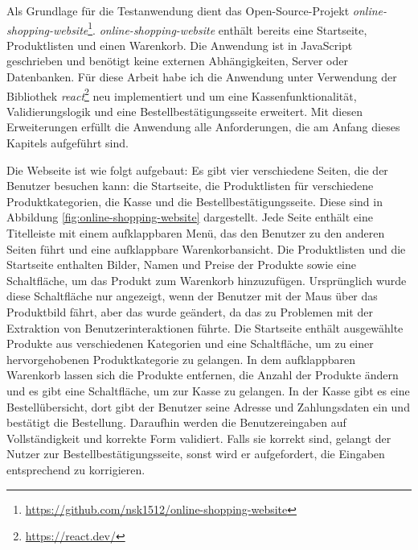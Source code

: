 Als Grundlage für die Testanwendung dient das Open-Source-Projekt \textit{online-shopping-website}\footnote{\url{https://github.com/nsk1512/online-shopping-website}}.
\textit{online-shopping-website} enthält bereits eine Startseite, Produktlisten und einen Warenkorb.
Die Anwendung ist in JavaScript geschrieben und benötigt keine externen Abhängigkeiten, Server oder Datenbanken.
Für diese Arbeit habe ich die Anwendung unter Verwendung der Bibliothek \textit{react}\footnote{\url{https://react.dev/}} neu implementiert und um eine Kassenfunktionalität, Validierungslogik und eine Bestellbestätigungsseite erweitert.
Mit diesen Erweiterungen erfüllt die Anwendung alle Anforderungen, die am Anfang dieses Kapitels aufgeführt sind.


Die Webseite ist wie folgt aufgebaut:
Es gibt vier verschiedene Seiten, die der Benutzer besuchen kann: die Startseite, die Produktlisten für verschiedene Produktkategorien, die Kasse und die Bestellbestätigungsseite.
Diese sind in Abbildung \ref{fig:online-shopping-website} dargestellt.
Jede Seite enthält eine Titelleiste mit einem aufklappbaren Menü, das den Benutzer zu den anderen Seiten führt und eine aufklappbare Warenkorbansicht.
Die Produktlisten und die Startseite enthalten Bilder, Namen und Preise der Produkte sowie eine Schaltfläche, um das Produkt zum Warenkorb hinzuzufügen.
Ursprünglich wurde diese Schaltfläche nur angezeigt, wenn der Benutzer mit der Maus über das Produktbild fährt, aber das wurde geändert, da das zu Problemen mit der Extraktion von Benutzerinteraktionen führte.
Die Startseite enthält ausgewählte Produkte aus verschiedenen Kategorien und eine Schaltfläche, um zu einer hervorgehobenen Produktkategorie zu gelangen.
In dem aufklappbaren Warenkorb lassen sich die Produkte entfernen, die Anzahl der Produkte ändern und es gibt eine Schaltfläche, um zur Kasse zu gelangen.
In der Kasse gibt es eine Bestellübersicht, dort gibt der Benutzer seine Adresse und Zahlungsdaten ein und bestätigt die Bestellung.
Daraufhin werden die Benutzereingaben auf Vollständigkeit und korrekte Form validiert.
Falls sie korrekt sind, gelangt der Nutzer zur Bestellbestätigungsseite, sonst wird er aufgefordert, die Eingaben entsprechend zu korrigieren.

